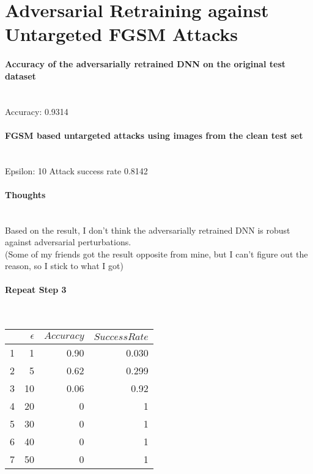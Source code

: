 \documentclass{article}
\begin{document}
\section{Adversarial Retraining against Untargeted FGSM Attacks}
\paragraph{Accuracy of the adversarially retrained DNN on the original test dataset} \mbox{}\\
Accuracy: 0.9314

\paragraph{FGSM based untargeted attacks using images from the clean test set} \mbox{}\\ 
Epsilon: 10 Attack success rate 0.8142

\paragraph{Thoughts} \mbox{}\\Based on the result, I don't think the adversarially retrained DNN is robust against adversarial perturbations.
\\(Some of my friends got the result opposite from mine, but I can't figure out the reason, so I stick to what I got) 

\paragraph{Repeat Step 3 }\mbox{}\\
\begin{table}[h]
\centering    
 \begin{tabular}{rrrr} 
     \hline
	\hline
       & $\epsilon $ & $ Accuracy $ & $ Success Rate $\\ [0.5ex]
       \hline
       1 & 1 & 0.90 & 0.030  \\
       2 & 5 & 0.62 & 0.299 \\
       3 & 10 & 0.06 & 0.92 \\
       4 & 20 & 0 & 1 \\
       5 & 30 & 0 & 1 \\
       6 & 40 & 0 & 1 \\
       7 & 50 & 0 & 1 \\
       \hline
       \hline
   \end{tabular}
\end{table}
\end{document}
